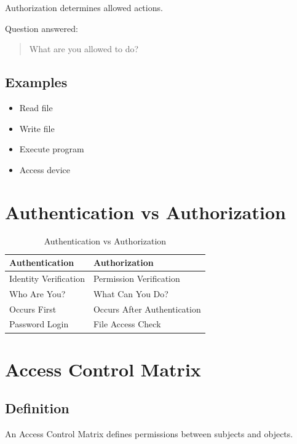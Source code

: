 Authorization determines allowed actions.

Question answered:

\begin{quote}
What are you allowed to do?
\end{quote}

\subsection{Examples}

\begin{itemize}
\item Read file
\item Write file
\item Execute program
\item Access device
\end{itemize}

\section{Authentication vs Authorization}

\begin{table}[h]
\centering
\begin{tabular}{|p{5cm}|p{5cm}|}
\hline
Authentication & Authorization \\
\hline
Identity Verification & Permission Verification \\
\hline
Who Are You? & What Can You Do? \\
\hline
Occurs First & Occurs After Authentication \\
\hline
Password Login & File Access Check \\
\hline
\end{tabular}
\caption{Authentication vs Authorization}
\end{table}

\section{Access Control Matrix}

\subsection{Definition}

An Access Control Matrix defines permissions between subjects and objects.

